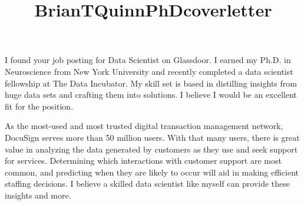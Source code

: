 \documentclass[11pt, a4paper]{awesome-cv}
\title{BrianTQuinnPhDcoverletter}
\begin{document}
\makecvheader

\makelettertitle

\begin{cvletter}
I found your job posting for Data Scientist on Glassdoor. I earned my Ph.D. in Neuroscience from New York University and recently completed a data scientist fellowship at The Data Incubator. My skill set is based in distilling insights from huge data sets and crafting them into solutions. I believe I would be an excellent fit for the position.  

As the most-used and most trusted digital transaction management network, DocuSign serves more than 50 million users. With that many users, there is great value in analyzing the data generated by customers as they use and seek support for services. Determining which interactions with customer support are most common, and predicting when they are likely to occur will aid in making efficient staffing decisions. I believe a skilled data scientist like myself can provide these insights and more. 




\end{cvletter}
\end{document}
